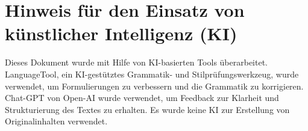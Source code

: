 \documentclass{template}
\begin{document}
\newpage
\PrintBib

\section*{Hinweis für den Einsatz von künstlicher Intelligenz (KI)}

Dieses Dokument wurde mit Hilfe von KI-basierten Tools überarbeitet. LanguageTool, ein KI-gestütztes Grammatik- und Stilprüfungswerkzeug, wurde verwendet, um Formulierungen zu verbessern und die Grammatik zu korrigieren. Chat-GPT von Open-AI wurde verwendet, um Feedback zur Klarheit und Strukturierung des Textes zu erhalten. Es wurde keine KI zur Erstellung von Originalinhalten verwendet.
\end{document}
